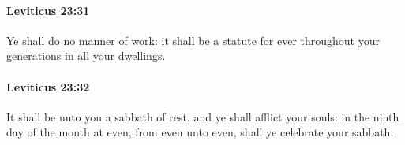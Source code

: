 		\paragraph{Leviticus 23:31} %
			\label{LEVITICUS-23-31}

			Ye shall do no manner of work: it shall be a statute for ever throughout your generations in all your dwellings.


		\paragraph{Leviticus 23:32} %
			\label{LEVITICUS-23-32}

			It shall be unto you a sabbath of rest, and ye shall afflict your souls: in the ninth day of the month at even, from even unto even, shall ye celebrate your sabbath.



